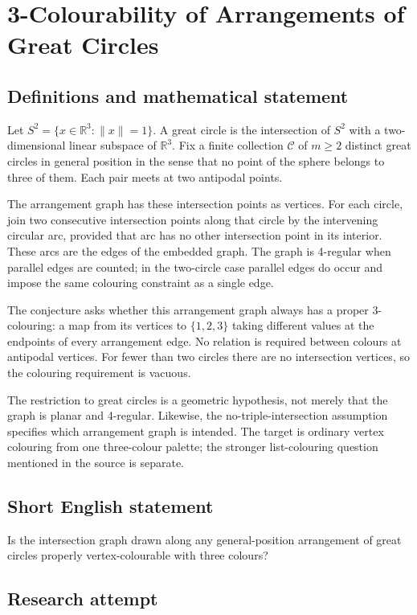 \documentclass[11pt,a4paper]{article}
\begin{document}
\section*{3-Colourability of Arrangements of Great Circles}\label{statement}

\subsection{Definitions and mathematical statement}
Let $S^2=\{x\in\mathbb R^3:\|x\|=1\}$. A great circle is the
intersection of $S^2$ with a two-dimensional linear subspace of
$\mathbb R^3$. Fix a finite collection $\mathcal C$ of $m\ge2$
distinct great circles in general position in the sense that no
point of the sphere belongs to three of them. Each pair meets at
two antipodal points.

The arrangement graph has these intersection points as vertices.
For each circle, join two consecutive intersection points along
that circle by the intervening circular arc, provided that arc has
no other intersection point in its interior. These arcs are the
edges of the embedded graph. The graph is 4-regular when parallel
edges are counted; in the two-circle case parallel edges do occur
and impose the same colouring constraint as a single edge.

The conjecture asks whether this arrangement graph always has a
proper 3-colouring: a map from its vertices to $\{1,2,3\}$ taking
different values at the endpoints of every arrangement edge.
No relation is required between colours at antipodal vertices.
For fewer than two circles there are no intersection vertices,
so the colouring requirement is vacuous.

The restriction to great circles is a geometric hypothesis, not
merely that the graph is planar and 4-regular. Likewise, the
no-triple-intersection assumption specifies which arrangement graph
is intended. The target is ordinary vertex colouring from one
three-colour palette; the stronger list-colouring question mentioned
in the source is separate.
\subsection{Short English statement}
Is the intersection graph drawn along any general-position arrangement of great circles properly vertex-colourable with three colours?
\subsection{Research attempt}
\end{document}
